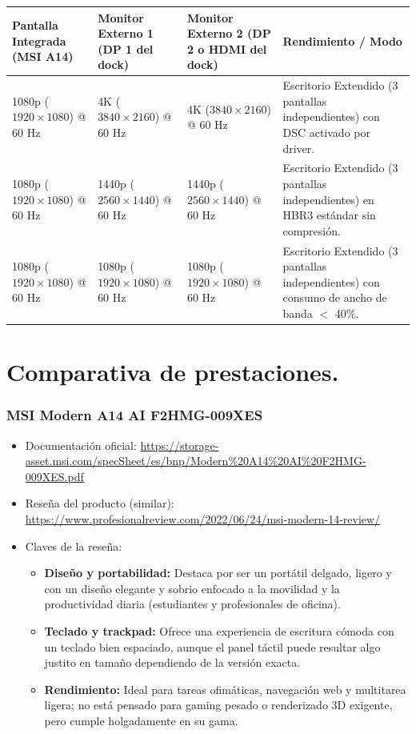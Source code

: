 \documentclass[11.5pt]{article}
\begin{document}
	\begin{table}[H]
		\centering
		\footnotesize
		\renewcommand{\arraystretch}{1.3}
		\begin{tabularx}{\textwidth}{|X|X|X|X|}
			\hline
			\textbf{Pantalla Integrada (MSI A14)} & \textbf{Monitor Externo 1 (DP 1 del dock)} & \textbf{Monitor Externo 2 (DP 2 o HDMI del dock)} & \textbf{Rendimiento / Modo} \\
			\hline
			1080p ($1920\times1080$) @ 60 Hz & 4K ($3840\times2160$) @ 60 Hz & 4K ($3840\times2160$) @ 60 Hz & Escritorio Extendido (3 pantallas independientes) con DSC activado por driver. \\
			\hline
			1080p ($1920\times1080$) @ 60 Hz & 1440p ($2560\times1440$) @ 60 Hz & 1440p ($2560\times1440$) @ 60 Hz & Escritorio Extendido (3 pantallas independientes) en HBR3 estándar sin compresión. \\
			\hline
			1080p ($1920\times1080$) @ 60 Hz & 1080p ($1920\times1080$) @ 60 Hz & 1080p ($1920\times1080$) @ 60 Hz & Escritorio Extendido (3 pantallas independientes) con consumo de ancho de banda $<$ 40\%. \\
			\hline
		\end{tabularx}
	\end{table}
	
	\section{Comparativa de prestaciones.}

	
	\subsubsection*{MSI Modern A14 AI F2HMG-009XES}
	\begin{itemize}
		\item Documentación oficial: \url{https://storage-asset.msi.com/specSheet/es/bnp/Modern\%20A14\%20AI\%20F2HMG-009XES.pdf}
		\item Reseña del producto (similar): \url{https://www.profesionalreview.com/2022/06/24/msi-modern-14-review/}
		\item Claves de la reseña:
		\begin{itemize}[label=$\bullet$]
			\item \textbf{Diseño y portabilidad:} Destaca por ser un portátil delgado, ligero y con un diseño elegante y sobrio enfocado a la movilidad y la productividad diaria (estudiantes y profesionales de oficina).
			\item \textbf{Teclado y trackpad:} Ofrece una experiencia de escritura cómoda con un teclado bien espaciado, aunque el panel táctil puede resultar algo justito en tamaño dependiendo de la versión exacta.
			\item \textbf{Rendimiento:} Ideal para tareas ofimáticas, navegación web y multitarea ligera; no está pensado para gaming pesado o renderizado 3D exigente, pero cumple holgadamente en su gama.
		\end{itemize}
		
	\end{itemize}
	
\end{document}
